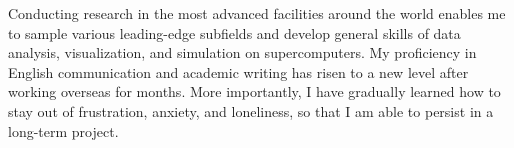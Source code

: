 \documentclass[11pt, a4paper]{awesome-cv} %
\begin{document}
	Conducting research in the most advanced facilities around the world enables me to sample various leading-edge subfields and develop general skills of data analysis, visualization, and simulation on supercomputers. My proficiency in English communication and academic writing has risen to a new level after working overseas for months. More importantly, I have gradually learned how to stay out of frustration, anxiety, and loneliness, so that I am able to persist in a long-term project.
\end{document}
